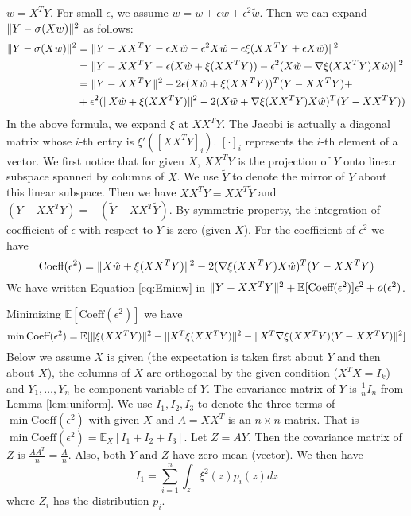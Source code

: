 \documentclass{article}
\DeclarePairedDelimiter\norm{\lVert}{\rVert}
\def\E{\mathbb{E}}
\begin{document}
$\bar{w} = X^T Y $. For small $\epsilon$, we assume $ w = \bar{w} + \epsilon \hat{w} + \epsilon^2 \tilde{w}$. Then we can expand $\norm{Y - \sigma (X w ) }^2$ as follows:
\begin{align*}
\norm{Y - \sigma (X w ) }^2 & = \norm{Y - XX^T Y - \epsilon X \hat{w} - \epsilon^2 X \tilde{w} - \epsilon \xi(XX^T Y + \epsilon X\hat{w}) }^2 \\
& = \norm{ Y - XX^T Y - \epsilon (X\hat{w} + \xi(XX^T Y)) - \epsilon^2(X\tilde{w} + \nabla \xi(XX^TY)X\hat{w})}^2 \\
& = \norm{Y-XX^T Y }^2 - 2 \epsilon (X \hat{w} + \xi(XX^TY))^T (Y-XX^TY) +\\
& +\epsilon^2(\norm{X\hat{w} + \xi(XX^TY)}^2 - 2 (X \tilde{w}+ \nabla \xi(XX^TY)X\hat{w})^T(Y-XX^TY))
\end{align*}
In the above formula,  we expand $\xi$ at $XX^TY$. The Jacobi is actually a diagonal matrix whose $i$-th entry is $\xi'([XX^TY]_i)$. $[\cdot]_i$ represents the $i$-th element of a vector.
We first notice that for given $X$, $XX^TY$ is the projection of $Y$ onto linear subspace spanned by columns of $X$. We use $\tilde{Y}$ to denote the mirror of $Y$ about this linear subspace. Then we have
$XX^T Y = XX^T \tilde{Y}$ and $(Y- XX^TY) = -(\tilde{Y} - XX^T \tilde{Y})$. By symmetric property, the integration of coefficient of $\epsilon$ with respect to $Y$ is zero (given $X$). For the coefficient of $\epsilon^2$ we have
\begin{equation*}
\textrm{Coeff}(\epsilon^2)  =  \norm{X\hat{w} + \xi(XX^TY)}^2 - 2 (\nabla \xi(XX^TY)X\hat{w})^T(Y-XX^TY)
\end{equation*}
We have written Equation \eqref{eq:Eminw} in $ \norm{Y - X X^T Y}^2 + \E[\textrm{Coeff}(\epsilon^2)] \epsilon^2 + o(\epsilon^2)$.

Minimizing $\E[\textrm{Coeff}(\epsilon^2)]$ we have
\begin{equation}
\min \textrm{Coeff}(\epsilon^2) = \E[\norm{\xi(XX^TY)}^2 - \norm{X^T\xi(XX^TY)}^2 - \norm{X^T \nabla\xi(XX^TY)(Y-XX^TY)}^2]
\end{equation}
Below we assume $X$ is given (the expectation is taken first about $Y$ and then about $X$), the columns of $X$ are orthogonal by the given condition ($X^TX=I_k$) and $Y_1, \dots, Y_n $ be component variable of $Y$. The covariance matrix of $Y$ is $\frac{1}{n}I_n$ from Lemma \ref{lem:uniform}. We use $I_1, I_2, I_3$ to denote the three terms of $\min \textrm{Coeff}(\epsilon^2)$ with given $X$ and $A=XX^T$ is an $n\times n$ matrix. That is $ \min \textrm{Coeff}(\epsilon^2) = \E_{X} [I_1 + I_2 + I_3]$.
Let $Z = AY$. Then the covariance matrix of $Z$ is $\frac{AA^T}{n} = \frac{A}{n}$.
Also, both $Y$ and $Z$ have zero mean (vector). We then have
\begin{equation*}
I_1 = \sum_{i=1}^n \int_z \xi^2(z) p_i(z) dz
\end{equation*}
where $Z_i$ has the distribution $p_i$.
 
\end{document}

